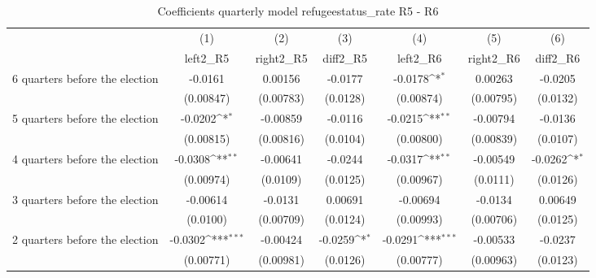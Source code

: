 \begin{table}[htbp]\centering
\def\sym#1{\ifmmode^{#1}\else\(^{#1}\)\fi}
\caption{Coefficients quarterly model refugeestatus\_rate R5 - R6}
\begin{tabular}{l*{6}{c}}
\hline\hline
                    &\multicolumn{1}{c}{(1)}&\multicolumn{1}{c}{(2)}&\multicolumn{1}{c}{(3)}&\multicolumn{1}{c}{(4)}&\multicolumn{1}{c}{(5)}&\multicolumn{1}{c}{(6)}\\
                    &\multicolumn{1}{c}{left2\_R5}&\multicolumn{1}{c}{right2\_R5}&\multicolumn{1}{c}{diff2\_R5}&\multicolumn{1}{c}{left2\_R6}&\multicolumn{1}{c}{right2\_R6}&\multicolumn{1}{c}{diff2\_R6}\\
\hline
 6 quarters before the election&     -0.0161         &     0.00156         &     -0.0177         &     -0.0178\sym{*}  &     0.00263         &     -0.0205         \\
                    &   (0.00847)         &   (0.00783)         &    (0.0128)         &   (0.00874)         &   (0.00795)         &    (0.0132)         \\
[1em]
 5 quarters before the election&     -0.0202\sym{*}  &    -0.00859         &     -0.0116         &     -0.0215\sym{**} &    -0.00794         &     -0.0136         \\
                    &   (0.00815)         &   (0.00816)         &    (0.0104)         &   (0.00800)         &   (0.00839)         &    (0.0107)         \\
[1em]
 4 quarters before the election&     -0.0308\sym{**} &    -0.00641         &     -0.0244         &     -0.0317\sym{**} &    -0.00549         &     -0.0262\sym{*}  \\
                    &   (0.00974)         &    (0.0109)         &    (0.0125)         &   (0.00967)         &    (0.0111)         &    (0.0126)         \\
[1em]
 3 quarters before the election&    -0.00614         &     -0.0131         &     0.00691         &    -0.00694         &     -0.0134         &     0.00649         \\
                    &    (0.0100)         &   (0.00709)         &    (0.0124)         &   (0.00993)         &   (0.00706)         &    (0.0125)         \\
[1em]
 2 quarters before the election&     -0.0302\sym{***}&    -0.00424         &     -0.0259\sym{*}  &     -0.0291\sym{***}&    -0.00533         &     -0.0237         \\
                    &   (0.00771)         &   (0.00981)         &    (0.0126)         &   (0.00777)         &   (0.00963)         &    (0.0123)         \\

\end{tabular}
\end{table}
